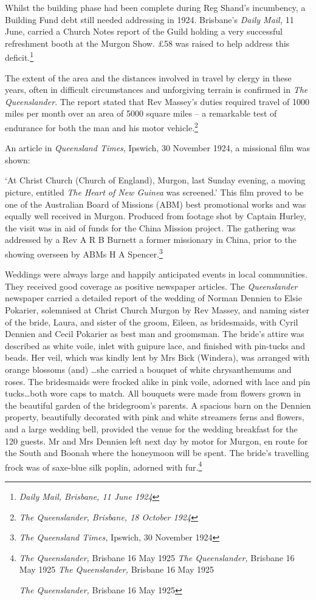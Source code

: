Whilst the building phase had been complete during Reg Shand's incumbency, a Building Fund debt still needed addressing in 1924. Brisbane's \emph{Daily Mail,} 11 June, carried a Church Notes report of the Guild holding a very successful refreshment booth at the Murgon Show. £58 was raised to help address this deficit.\footnote{\emph{Daily Mail, Brisbane, 11 June 1924}}

The extent of the area and the distances involved in travel by clergy in these years, often in difficult circumstances and unforgiving terrain is confirmed in \emph{The Queenslander}. The report stated that Rev Massey's duties required travel of 1000 miles per month over an area of 5000 square miles -- a remarkable test of endurance for both the man and his motor vehicle.\footnote{\emph{The Queenslander, Brisbane, 18 October 1924}}

An article in \emph{Queensland Times}, Ipswich, 30 November 1924, a missional film was shown:

`At Christ Church (Church of England), Murgon, last Sunday evening, a moving picture, entitled \emph{The Heart of New Guinea} was screened.' This film proved to be one of the Australian Board of Missions (ABM) best promotional works and was equally well received in Murgon. Produced from footage shot by Captain Hurley, the visit was in aid of funds for the China Mission project\emph{.} The gathering was addressed by a Rev A R B Burnett a former missionary in China, prior to the showing overseen by ABMs H A Spencer.\footnote{\emph{The Queensland Times,} Ipswich, 30 November 1924}

Weddings were always large and happily anticipated events in local communities. They received good coverage as positive newspaper articles. The \emph{Queenslander} newspaper carried a detailed report of the wedding of Norman Dennien to Elsie Pokarier, solemnised at Christ Church Murgon by Rev Massey, and naming sister of the bride, Laura, and sister of the groom, Eileen, as bridesmaids, with Cyril Dennien and Cecil Pokarier as best man and groomsman. The bride's attire was described as white voile, inlet with guipure lace, and finished with pin-tucks and beads. Her veil, which was kindly lent by Mrs Bick (Windera), was arranged with orange blossoms (and) \ldots she carried a bouquet of white chrysanthemums and roses. The bridesmaids were frocked alike in pink voile, adorned with lace and pin tucks\ldots both wore caps to match. All bouquets were made from flowers grown in the beautiful garden of the bridegroom's parents. A spacious barn on the Dennien property, beautifully decorated with pink and white streamers ferns and flowers, and a large wedding bell, provided the venue for the wedding breakfast for the 120 guests. Mr and Mrs Dennien left next day by motor for Murgon, en route for the South and Boonah where the honeymoon will be spent. The bride's travelling frock was of saxe-blue silk poplin, adorned with fur.\footnote{\emph{The Queenslander,} Brisbane 16 May 1925 \emph{The Queenslander,} Brisbane 16 May 1925 \emph{The Queenslander,} Brisbane 16 May 1925

  \emph{The Queenslander,} Brisbane 16 May 1925}

